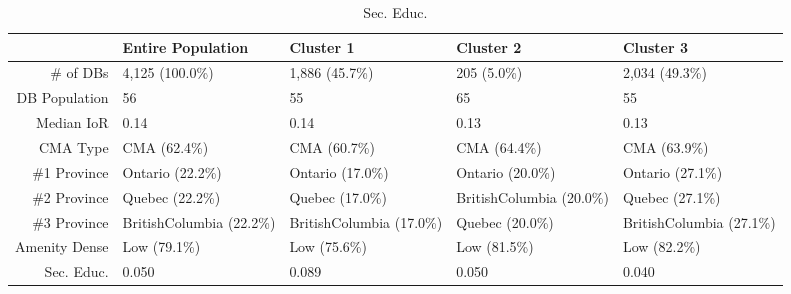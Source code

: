 \documentclass[11pt, a4paper]{article}
\begin{document}
\begin{sidewaystable}[ht]
\centering
\begin{tabular}{rllll}
  \hline
 & Entire Population & Cluster 1 & Cluster 2 & Cluster 3 \\ 
  \hline
\# of DBs & 4,125 (100.0\%) & 1,886 (45.7\%) & 205 (5.0\%) & 2,034 (49.3\%) \\ 
  DB Population & 56 & 55 & 65 & 55 \\ 
  Median IoR & 0.14 & 0.14 & 0.13 & 0.13 \\ 
  CMA Type & CMA (62.4\%) & CMA (60.7\%) & CMA (64.4\%) & CMA (63.9\%) \\ 
  \#1 Province & Ontario (22.2\%) & Ontario (17.0\%) & Ontario (20.0\%) & Ontario (27.1\%) \\ 
  \#2 Province & Quebec (22.2\%) & Quebec (17.0\%) & BritishColumbia (20.0\%) & Quebec (27.1\%) \\ 
  \#3 Province & BritishColumbia (22.2\%) & BritishColumbia (17.0\%) & Quebec (20.0\%) & BritishColumbia (27.1\%) \\ 
  Amenity Dense & Low (79.1\%) & Low (75.6\%) & Low (81.5\%) & Low (82.2\%) \\ 
  Sec. Educ. & 0.050 & 0.089 & 0.050 & 0.040 \\ 
   \hline
\end{tabular}
\caption{Sec. Educ.} 
\end{sidewaystable}





 \pagebreak 
 
\end{document}
